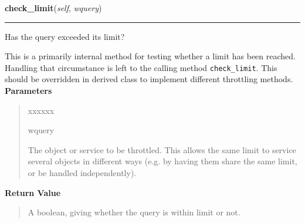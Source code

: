     \label{biblio:webquery:querythrottle:BaseQueryThrottle:check_limit}

    \vspace{0.5ex}

\hspace{.8\funcindent}\begin{boxedminipage}{\funcwidth}

    \raggedright \textbf{check\_limit}(\textit{self}, \textit{wquery})

    \vspace{-1.5ex}

    \rule{\textwidth}{0.5\fboxrule}
\setlength{\parskip}{2ex}

Has the query exceeded its limit?

This is a primarily internal method for testing whether a limit has been
reached. Handling that circumstance is left to the calling method
\texttt{check{\_}limit}. This should be overridden in derived class to implement
different throttling methods.
\setlength{\parskip}{1ex}
      \textbf{Parameters}
      \vspace{-1ex}

      \begin{quote}
        \begin{Ventry}{xxxxxx}

          \item[wquery]


The object or service to be throttled. This allows the same limit
to service several objects in different ways (e.g. by having them
share the same limit, or be handled independently).
        \end{Ventry}

      \end{quote}

      \textbf{Return Value}
    \vspace{-1ex}

      \begin{quote}

A boolean, giving whether the query is within limit or not.
      \end{quote}

    \end{boxedminipage}

